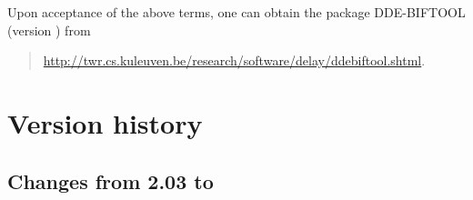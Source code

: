 \documentclass[10pt]{scrartcl}
\newcommand{\DDEBIFCODE}{\textsc{DDE-BIFTOOL}}
\newcommand{\ddebifweb}{\url{http://twr.cs.kuleuven.be/research/software/delay/ddebiftool.shtml}}
\begin{document}
Upon acceptance of the above terms, one can obtain the package
{\DDEBIFCODE} (version \version{}) from
\begin{quote}
  \ddebifweb{}.
\end{quote}

\section{Version history}
\label{sec:changes}

\subsection{Changes from 2.03 to \version}
\label{sec:v2to3}
\end{document}

